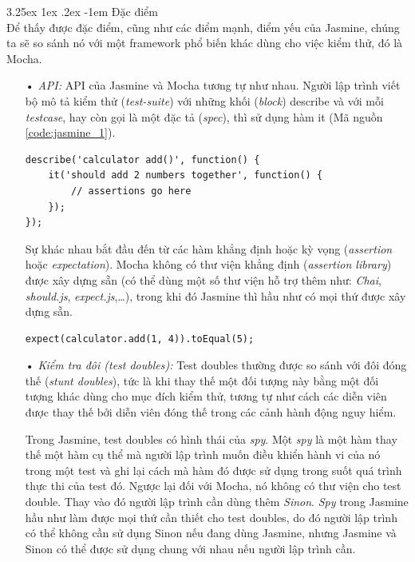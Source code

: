 \documentclass[12pt,a4paper,twoside]{article}
\makeatletter
\newcommand{\myparagraph}[1]{\paragraph{#1}\mbox{}\\} %
\renewcommand\paragraph{\@startsection{paragraph}{5}{\z@}%
  {3.25ex \@plus1ex \@minus.2ex}%
  {-1em}%
  {\normalfont\normalsize\bfseries}}
\makeatother
\begin{document}
\myparagraph{Đặc điểm}
Để thấy được đặc điểm, cũng như các điểm mạnh, điểm yếu của Jasmine, chúng ta sẽ so sánh\cite{mocha_vs_jasmine} nó với một framework phổ biến khác dùng cho việc kiểm thử, đó là Mocha.
\begin{itemize}
\item[•] \emph{API:} 
API của Jasmine và Mocha tương tự như nhau. Người lập trình viết bộ mô tả kiểm thử (\textit{test-suite}) với những khối (\textit{block}) \textsf{describe} và với mỗi \textit{testcase}, hay còn gọi là một đặc tả (\textit{spec}), thì sử dụng hàm \textsf{it} (Mã nguồn \ref{code:jasmine_1}).

\begin{lstlisting}[caption=Cấu trúc của một test-suite trong Jasmine,label={code:jasmine_1}]
describe('calculator add()', function() {
	it('should add 2 numbers together', function() {
		// assertions go here
	});
});
\end{lstlisting}

Sự khác nhau bắt đầu đến từ các hàm khẳng định hoặc kỳ vọng (\textit{assertion} hoặc \textit{expectation}). Mocha không có thư viện khẳng định (\textit{assertion library}) được xây dựng sẵn (có thể dùng một số thư viện hỗ trợ thêm như: \textit{Chai}, \textit{should.js}, \textit{expect.js},…), trong khi đó Jasmine thì hầu như có mọi thứ được xây dựng sẵn.

\begin{lstlisting}[caption=Ví dụ sử dụng \textsf{expect} trong Jasmine,label={code:jasmine_2}]
expect(calculator.add(1, 4)).toEqual(5);
\end{lstlisting}

\item[•] \emph{Kiểm tra đôi (test doubles):}
Test doubles thường được so sánh với đôi đóng thế (\textit{stunt doubles}), tức là khi thay thế một đối tượng này bằng một đối tượng khác dùng cho mục đích kiểm thử, tương tự như cách các diễn viên được thay thế bởi diễn viên đóng thế trong các cảnh hành động nguy hiểm.

Trong Jasmine, test doubles có hình thái của \textit{spy}. Một \textit{spy} là một hàm thay thế một hàm cụ thể mà người lập trình muốn điều khiển hành vi của nó trong một test và ghi lại cách mà hàm đó được sử dụng trong suốt quá trình thực thi của test đó.
Ngược lại đối với Mocha, nó không có thư viện cho test double. Thay vào đó người lập trình cần dùng thêm \textit{Sinon}. \textit{Spy} trong Jasmine hầu như làm được mọi thứ cần thiết cho test doubles, do đó người lập trình có thể không cần sử dụng Sinon nếu đang dùng Jasmine, nhưng Jasmine và Sinon có thể được sử dụng chung với nhau nếu người lập trình cần.


\end{itemize}
\end{document}
